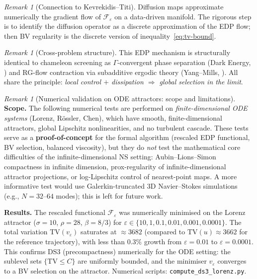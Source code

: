 \documentclass[12pt,a4paper]{article}
\theoremstyle{definition}
\theoremstyle{plain}
\theoremstyle{remark}
\newtheorem{remark}[definition]{Remark}
\begin{document}
\begin{remark}[Connection to Kevrekidis--Titi]\label{rem:kevrekidis-edp}
Diffusion maps \cite{KevrekidisTiti2024} approximate numerically the gradient flow of $\mathcal{F}_\varepsilon$ on a data-driven manifold. The rigorous step is to identify the diffusion operator as a discrete approximation of the EDP flow; then BV regularity is the discrete version of inequality~\eqref{eq:tv-bound}.
\end{remark}

\begin{remark}[Cross-problem structure]\label{rem:cross-edp}
This EDP mechanism is structurally identical to chameleon screening as $\Gamma$-convergent phase separation (Dark Energy, \cite{Geiger2026-DE}) and RG-flow contraction via subadditive ergodic theory (Yang--Mills, \cite{Geiger2026-YM}). All share the principle: \emph{local control $+$ dissipation $\Rightarrow$ global selection in the limit}.
\end{remark}

\begin{remark}[Numerical validation on ODE attractors: scope and limitations]\label{rem:ds3-lorenz}
\textbf{Scope.}\; The following numerical tests are performed on \emph{finite-dimensional ODE systems} (Lorenz, R\"ossler, Chen), which have smooth, finite-dimensional attractors, global Lipschitz nonlinearities, and no turbulent cascade.  These tests serve as a \textbf{proof-of-concept} for the formal algorithm (rescaled EDP functional, BV selection, balanced viscosity), but they do \emph{not} test the mathematical core difficulties of the infinite-dimensional NS setting: Aubin--Lions--Simon compactness in infinite dimension, prox-regularity of infinite-dimensional attractor projections, or log-Lipschitz control of nearest-point maps.  A more informative test would use Galerkin-truncated 3D Navier--Stokes simulations (e.g., $N = 32$--$64$ modes); this is left for future work.

\medskip\noindent
\textbf{Results.}\; The rescaled functional $\mathcal{F}_\varepsilon$ was numerically minimised on the Lorenz attractor ($\sigma = 10$, $\rho = 28$, $\beta = 8/3$) for $\varepsilon \in \{10, 1, 0.1, 0.01, 0.001, 0.0001\}$. The total variation $\mathrm{TV}(v_\varepsilon)$ saturates at $\approx 3682$ (compared to $\mathrm{TV}(u) \approx 3662$ for the reference trajectory), with less than $0.3\%$ growth from $\varepsilon = 0.01$ to $\varepsilon = 0.0001$. This confirms DS3 (precompactness) numerically for the ODE setting: the sublevel sets $\{\mathrm{TV} \leq C\}$ are uniformly bounded, and the minimiser $v_\varepsilon$ converges to a BV selection on the attractor. Numerical scripts: \texttt{compute\_ds3\_lorenz.py}.
\end{remark}
\end{document}
